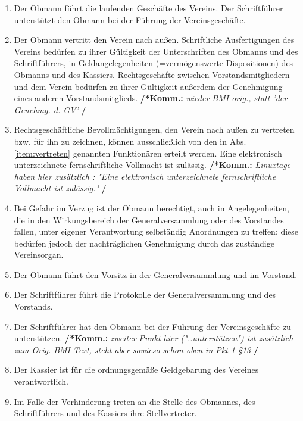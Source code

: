 \documentclass[a4paper,12pt]{article}
\newcommand{\comment}[1]{{\bf /*Komm.:} \textit{#1} {\bf */}}
\begin{document}
\begin{enumerate}
\item Der Obmann führt die laufenden Geschäfte des Vereins. Der Schriftführer unterstützt den Obmann bei der Führung der Vereinsgeschäfte.
\item \label{item:vertreten} Der Obmann vertritt den Verein nach außen.
Schriftliche Ausfertigungen des Vereins bedürfen zu ihrer Gültigkeit der Unterschriften des Obmanns und des Schriftführers, in Geldangelegenheiten (=vermögenswerte Dispositionen) des Obmanns und des Kassiers.
Rechtsgeschäfte zwischen Vorstandsmitgliedern und dem Verein bedürfen zu ihrer Gültigkeit außerdem der Genehmigung eines anderen Vorstandsmitglieds. \comment{wieder BMI orig., statt 'der Genehmg. d. GV'}

\item Rechtsgeschäftliche Bevollmächtigungen, den Verein nach außen zu vertreten bzw. für ihn zu zeichnen, können ausschließlich von den in Abs. \ref{item:vertreten} genannten Funktionären erteilt werden. Eine elektronisch unterzeichnete fernschriftliche Vollmacht ist zulässig.
\comment{Linuxtage haben hier zusätzlich : "Eine elektronisch unterzeichnete fernschriftliche Vollmacht ist zulässig." }

\item Bei Gefahr im Verzug ist der Obmann berechtigt, auch in Angelegenheiten, die in den Wirkungsbereich der Generalversammlung oder des Vorstandes fallen, unter eigener Verantwortung selbständig Anordnungen zu treffen; diese bedürfen jedoch der nachträglichen Genehmigung durch das zuständige Vereinsorgan.

\item Der Obmann führt den Vorsitz in der Generalversammlung und im Vorstand.

\item Der Schriftführer führt die Protokolle der Generalversammlung und des Vorstands.
\item Der Schriftführer hat den Obmann bei der Führung der Vereinsgeschäfte zu unterstützen.
\comment{zweiter Punkt hier ("..unterstützen") ist zusätzlich zum Orig. BMI Text, steht aber sowieso schon oben in Pkt 1 §13}

\item Der Kassier ist für die ordnungsgemäße Geldgebarung des Vereines verantwortlich.

\item Im Falle der Verhinderung treten an die Stelle des Obmannes, des Schriftführers und des Kassiers ihre Stellvertreter.

\end{enumerate}
\end{document}
